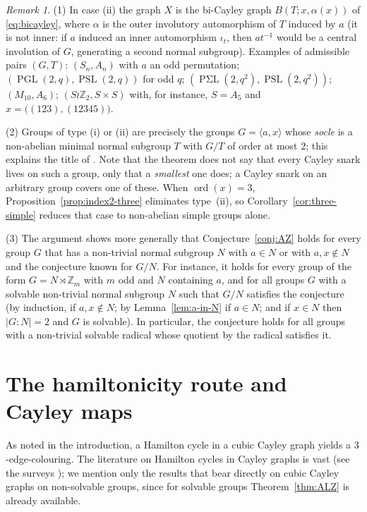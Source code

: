 \documentclass[11pt,a4paper]{article}
\theoremstyle{definition}
\theoremstyle{remark}
\newtheorem{remark}[theorem]{Remark}
\newcommand{\ord}{\operatorname{ord}}
\newcommand{\PSL}{\operatorname{PSL}}
\newcommand{\PGL}{\operatorname{PGL}}
\newcommand{\PSigmaL}{\operatorname{P\Sigma L}}
\newcommand{\ZZ}{\mathbb{Z}}
\begin{document}
\begin{remark}
(1) In case (ii) the graph $X$ is the bi-Cayley graph $B(T;x,\alpha(x))$ of \eqref{eq:bicayley}, where $\alpha$ is the outer involutory automorphism of $T$ induced by $a$ (it is not inner: if $a$ induced an inner automorphism $\iota_t$, then $at^{-1}$ would be a central involution of $G$, generating a second normal subgroup).  Examples of admissible pairs $(G,T)$: $(S_n,A_n)$ with $a$ an odd permutation; $(\PGL(2,q),\PSL(2,q))$ for odd $q$; $(\PSigmaL(2,q^2),\PSL(2,q^2))$; $(M_{10},A_6)$; $(S\wr\ZZ_2,S\times S)$ with, for instance, $S=A_5$ and $x=\bigl((123),(12345)\bigr)$.

(2) Groups of type (i) or (ii) are precisely the groups $G=\langle a,x\rangle$ whose \emph{socle} is a non-abelian minimal normal subgroup $T$ with $G/T$ of order at most $2$; this explains the title of \cite{NS01}.  Note that the theorem does not say that every Cayley snark lives on such a group, only that a \emph{smallest} one does; a Cayley snark on an arbitrary group covers one of these.  When $\ord(x)=3$, Proposition~\ref{prop:index2-three} eliminates type~(ii), so Corollary~\ref{cor:three-simple} reduces that case to non-abelian simple groups alone.

(3) The argument shows more generally that Conjecture~\ref{conj:AZ} holds for every group $G$ that has a non-trivial normal subgroup $N$ with $a\in N$ or with $a,x\notin N$ and the conjecture known for $G/N$.  For instance, it holds for every group of the form $G=N\rtimes\ZZ_m$ with $m$ odd and $N$ containing $a$, and for all groups $G$ with a solvable non-trivial normal subgroup $N$ such that $G/N$ satisfies the conjecture (by induction, if $a,x\notin N$; by Lemma~\ref{lem:a-in-N} if $a\in N$; and if $x\in N$ then $|G:N|=2$ and $G$ is solvable).  In particular, the conjecture holds for all groups with a non-trivial solvable radical whose quotient by the radical satisfies it.
\end{remark}

\section{The hamiltonicity route and Cayley maps}\label{sec:hamilton}

As noted in the introduction, a Hamilton cycle in a cubic Cayley graph yields a $3$-edge-colouring.  The literature on Hamilton cycles in Cayley graphs is vast (see the surveys \cite{CurranGallian96,KutnarMarusic09,PakRadoicic09}); we mention only the results that bear directly on cubic Cayley graphs on non-solvable groups, since for solvable groups Theorem~\ref{thm:ALZ} is already available.
\end{document}
